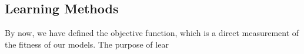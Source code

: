 \subsection {Learning Methods}
By now, we have defined the objective function, which is a direct measurement of the fitness of our models. The purpose of lear